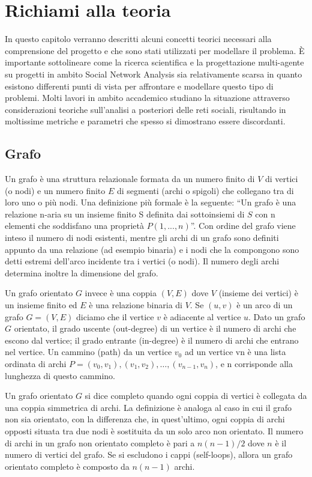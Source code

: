 \section{Richiami alla teoria}

In questo capitolo verranno descritti alcuni concetti teorici necessari alla comprensione del progetto e che sono stati utilizzati per modellare il problema.
È importante sottolineare come la ricerca scientifica e la progettazione multi-agente su progetti in ambito Social Network Analysis sia relativamente scarsa in quanto esistono differenti punti di vista per affrontare e modellare questo tipo di problemi. Molti lavori in ambito accademico studiano la situazione attraverso considerazioni teoriche sull'analisi a posteriori delle reti sociali, risultando in moltissime metriche e parametri che spesso si dimostrano essere discordanti.

\subsection{Grafo}

Un grafo è una struttura relazionale formata da un numero finito di $V$ di vertici (o nodi) e un numero finito $E$ di segmenti (archi o spigoli) che collegano tra di loro uno o più nodi.
Una definizione più formale è la seguente: “Un grafo è una relazione n-aria su un insieme finito S definita dai sottoinsiemi di $S$ con n elementi che soddisfano una proprietà $P(1,...,n)$”.
Con ordine del grafo viene inteso il numero di nodi esistenti, mentre gli archi di un grafo sono definiti appunto da una relazione (ad esempio binaria) e i nodi che la compongono sono detti estremi dell'arco incidente tra i vertici (o nodi). Il numero degli archi determina inoltre la dimensione del grafo. \cite{IntroToAlgorithms}

Un grafo orientato $G$ invece è una coppia $(V,E)$ dove $V$ (insieme dei vertici) è un insieme finito ed $E$ è una relazione binaria di $V$.
Se $(u,v)$ è un arco di un grafo $G = (V,E)$ diciamo che il vertice $v$ è adiacente al vertice $u$.
Dato un grafo $G$ orientato, il grado uscente (out-degree) di un vertice è il numero di archi che escono dal vertice; il grado entrante (in-degree) è il numero di archi che entrano nel vertice.
Un cammino (path) da un vertice $v_0$ ad un vertice vn è una lista ordinata di archi $P={(v_0,v_1),(v_1,v_2), … , (v_{n-1}, v_n)}$, e n corrisponde alla lunghezza di questo cammino.

Un grafo orientato $G$ si dice completo quando ogni coppia di vertici è collegata da una coppia simmetrica di archi. La definizione è analoga al caso in cui il grafo non sia orientato, con la differenza che, in quest'ultimo, ogni coppia di archi opposti situata tra due nodi è sostituita da un solo arco non orientato. Il numero di archi in un grafo non orientato completo è pari a $n(n-1)/2$ dove $n$ è il numero di vertici del grafo. Se si escludono i cappi (self-loops), allora un grafo orientato completo è composto da $n(n-1)$ archi.

